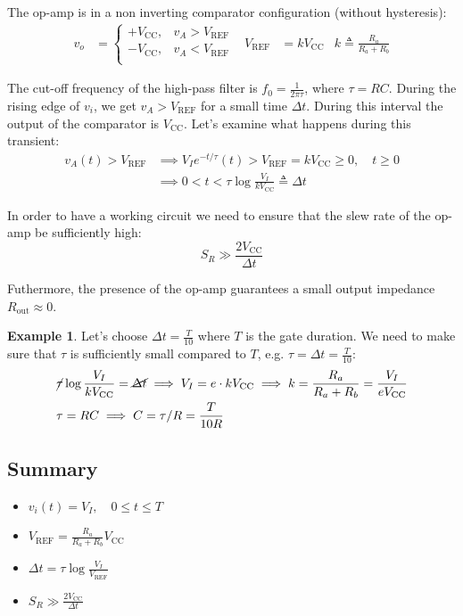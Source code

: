 \documentclass{article}
\newcommand{\var}[2]{#1_\mathrm{#2}}
\theoremstyle{definition}
\newtheorem{example}{Example}
\begin{document}
The op-amp is in a non inverting comparator configuration (without hysteresis):
\begin{align*}
    v_o &= \begin{cases}
        +\var{V}{CC}, & v_A > \var{V}{REF} \\
        -\var{V}{CC}, & v_A < \var{V}{REF} \\
    \end{cases}
    &
    \var{V}{REF} &= k \var{V}{CC}
    &
    k \triangleq \frac{R_a}{R_a + R_b}
\end{align*}

The cut-off frequency of the high-pass filter is \(f_0 = \frac{1}{2 \pi \tau}\), where \(\tau = RC\).
During the rising edge of \(v_i\), we get \(v_A > \var{V}{REF}\) for a small time \(\Delta t\).
During this interval the output of the comparator is \(\var{V}{CC}\).
%
Let's examine what happens during this transient:
\begin{align}
    v_A(t) > \var{V}{REF} & \implies
    V_I e^{-t/\tau} (t) > \var{V}{REF} = k \var{V}{CC} \geq 0,
    \quad t \ge 0 \nonumber \\
    & \implies 0 < t < \tau \log\frac{V_I}{k \var{V}{CC}} \triangleq \Delta t
    \label{eq:trigger-dt}
\end{align}

In order to have a working circuit we need to ensure that the slew rate of the op-amp be sufficiently high:
\[S_R \gg \frac{2 \var{V}{CC}}{\Delta t}\]

Futhermore, the presence of the op-amp guarantees a small output impedance \(\var{R}{out} \approx 0\).

\begin{example}
    Let's choose \(\Delta t = \frac{T}{10}\) where \(T\) is the gate duration.
    We need to make sure that \(\tau\) is sufficiently small compared to \(T\), e.g. \(\tau = \Delta t = \frac{T}{10}\):
    \begin{align*}
        &\cancel{\tau} \log\frac{V_I}{k \var{V}{CC}} = \cancel{\Delta t} \implies
        V_I = e \cdot k \var{V}{CC} \implies
        k = \frac{R_a}{R_a + R_b} = \frac{V_I}{e \var{V}{CC}} \\
        &\tau = RC \implies C = \tau/R = \frac{T}{10R}
    \end{align*}
\end{example}

\subsection{Summary}
\begin{itemize}
    \item \(v_i(t) = V_I, \quad 0 \le t \le T\)
    \item \(\var{V}{REF} = \frac{R_a}{R_a + R_b} \var{V}{CC}\)
    \item \(\Delta t = \tau \log\frac{V_I}{\var{V}{REF}}\)
    \item \(S_R \gg \frac{2\var{V}{CC}}{\Delta t}\)
\end{itemize}
\end{document}
